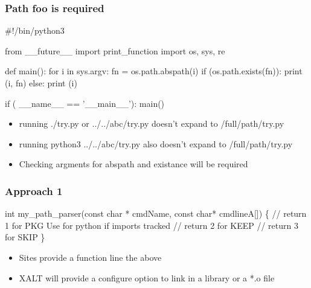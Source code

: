 \documentclass{beamer}
\begin{document}
\begin{frame}[fragile]
    \frametitle{Path foo is required}
 {\tiny
    \begin{semiverbatim}
#!/bin/python3

from __future__ import print_function
import os, sys, re

def main():
  for i in sys.argv:
    fn = os.path.abspath(i)
    if (os.path.exists(fn)):
      print (i, fn)
    else:
      print (i)
      
if ( __name__ == '__main__'): main()
    \end{semiverbatim}
}
  \begin{itemize}
    \item running ./try.py or ../../abc/try.py doesn't expand to
      /full/path/try.py
    \item running python3 ../../abc/try.py also doesn't expand to
      /full/path/try.py
    \item Checking argments for abspath and existance will be required
  \end{itemize}

\end{frame}

\begin{frame}[fragile]
    \frametitle{Approach 1}
 {\tiny
    \begin{semiverbatim}
       int my_path_parser(const char * cmdName, const char* cmdlineA[])
       \{
         // return 1 for PKG  Use for python if imports tracked
         // return 2 for KEEP
         // return 3 for SKIP
       \}
        
    \end{semiverbatim}
}
  \begin{itemize}
    \item Sites provide a function line the above
    \item XALT will provide a configure option to link in a library or
      a *.o file
  \end{itemize}

\end{frame}
\end{document}
